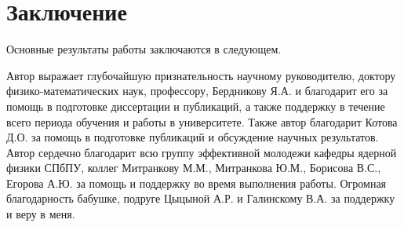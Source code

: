 \chapter*{Заключение}                       %


Основные результаты работы заключаются в следующем.


Автор выражает глубочайшую признательность научному руководителю, доктору физико-математических наук, профессору, Бердникову Я.А. и благодарит его за помощь в подготовке диссертации и публикаций, а также поддержку в течение всего периода обучения и работы в университете. Также автор благодарит Котова Д.О. за помощь в подготовке публикаций и обсуждение научных результатов. Автор сердечно благодарит всю группу эффективной молодежи кафедры ядерной физики СПбПУ, коллег Митранкову М.М., Митранкова Ю.М., Борисова В.С., Егорова А.Ю. за помощь и поддержку во время выполнения работы.
Огромная благодарность бабушке, подруге Цыцыной А.Р. и Галинскому В.А. за поддержку и веру в меня.

